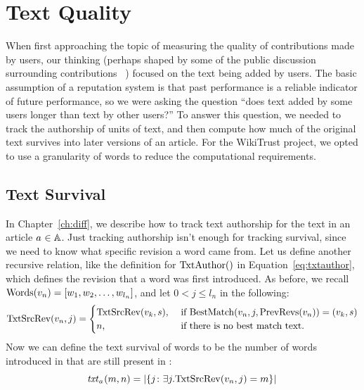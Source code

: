 \section{Text Quality}
\label{sec:textquality}

When first approaching the topic of measuring the quality
of contributions made by users, our thinking (perhaps shaped
by some of the public discussion surrounding
contributions~\cite{Swartz2006} )
focused on the text being added by users.
The basic assumption of a reputation system is that past performance
is a reliable indicator of future performance, so we were
asking the question ``does text added by some users 
longer than text by other users?''
To answer this question, we needed to track the authorship of
units of text, and then compute how much of the original text
survives into later versions of an article.
For the WikiTrust project, we opted to use a granularity of words
to reduce the computational requirements.

\subsection{Text Survival}

In Chapter~\ref{ch:diff}, we describe how to track text authorship
for the text in an article $a_{} \in \mathbb{A}$.
Just tracking authorship isn't enough for tracking survival, since
we need to know what specific revision a word came from.
Let us define another recursive relation, like the definition
for $\mathrm{TxtAuthor}()$ in Equation~\ref{eq:txtauthor},
which defines the revision that a word was first introduced.
As before, we recall
$\mathrm{Words}(v_{n}) = \left[ w_1, w_2, \ldots, w_{l_n} \right]$, and let $0 < j \le l_n$ in the following:
\begin{equation*}
\mathrm{TxtSrcRev}(v_{n}, j) =
    \begin{cases}
        \mathrm{TxtSrcRev}(v_{k}, s), & \text{ if }
        \mathrm{BestMatch}(v_{n}, j, \mathrm{PrevRevs}(v_{n})) = (v_{k}, s) \\
        n, & \text{ if there is no best match text. } \\
    \end{cases}
\end{equation*}
Now we can define the text survival of words to be the number of
words introduced in  that are still present in :
\begin{equation}
\mathit{txt}_{a_{}}(m,n) = \left| \left\{ j \colon
    \exists j . \mathrm{TxtSrcRev}(v_{n},j) = m \right\} \right| \\
\end{equation}

